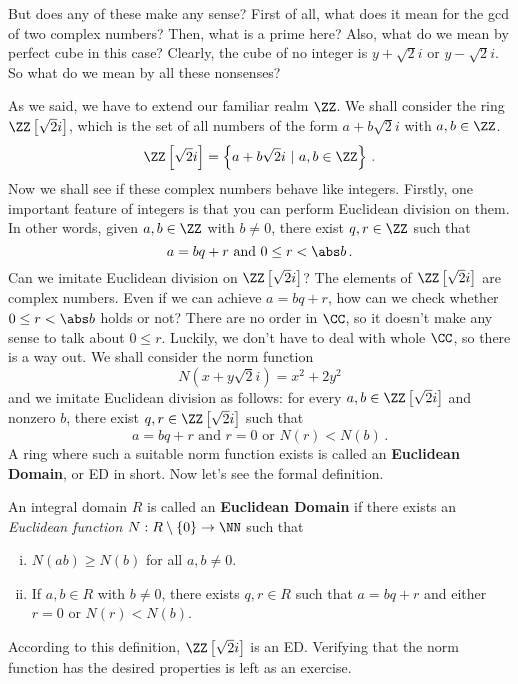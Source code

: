 \documentclass[11pt]{scrartcl}
\begin{document}
But does any of these make any sense? First of all, what does it mean for the gcd of two complex numbers? Then, what is a prime here? Also, what do we mean by perfect cube in this case? Clearly, the cube of no integer is \(y + \sqrt 2 i\) or \(y - \sqrt 2 i\). So what do we mean by all these nonsenses?

As we said, we have to extend our familiar realm \(\ZZ\). We shall consider the ring \(\ZZ \left[\sqrt 2 i\right] \), which is the set of all numbers of the form \(a+ b \sqrt 2i\) with \(a,b \in \ZZ\).
\[ \ZZ \left[\sqrt 2 i\right] = \left\{ a+ b \sqrt 2i \ | \ a,b\in \ZZ\right\} \,. \]
Now we shall see if these complex numbers behave like integers. Firstly, %
one important feature of integers is that you can perform Euclidean division on them. In other words, given \(a,b \in \ZZ\) with \(b \ne 0\), there exist \(q,r \in \ZZ\) such that
\[ a=bq+r \text{ and } 0 \le r < \abs b \,. \]
Can we imitate Euclidean division on \(\ZZ \left[\sqrt 2 i\right] \)? The elements of \(\ZZ \left[\sqrt 2 i\right] \) are complex numbers. Even if we can achieve \(a=bq+r\), how can we check whether \(0 \le r < \abs b\) holds or not? There are no order in \(\CC\), so it doesn't make any sense to talk about \(0 \le r\). Luckily, we don't have to deal with whole \(\CC\), so there is a way out. We shall consider the norm function
\[ N \left(x+ y \sqrt 2i\right) = x^2 + 2y^2  \]
and we imitate Euclidean division as follows: for every \(a,b \in \ZZ \left[\sqrt 2 i\right] \) and nonzero \(b\), there exist \(q,r \in \ZZ \left[\sqrt 2 i\right] \) such that
\[ a=bq+r \text{ and } r=0 \text{ or } N \left(r\right) < N \left(b\right) \,. \]
A ring where such a suitable norm function exists is called an \textbf{Euclidean Domain}, or ED in short. Now let's see the formal definition.
\begin{defn}
An integral domain \(R\) is called an \textbf{Euclidean Domain} if there exists an \textit{Euclidean function} \(N : R \setminus \left\{0\right\} \to \NN \) such that
\begin{enumerate}[(i)]
\item \(N \left(ab\right) \ge N \left(b\right) \) for all \(a,b \ne 0\).
\item If \(a,b \in R\) with \(b \ne 0\), there exists \(q,r \in R\) such that \(a = bq+r\) and either \(r = 0\) or \(N \left(r\right) < N \left(b\right)\).
\end{enumerate}
\end{defn}
According to this definition, \(\ZZ \left[\sqrt 2 i\right] \) is an ED. Verifying that the norm function has the desired properties is left as an exercise.
\end{document}
